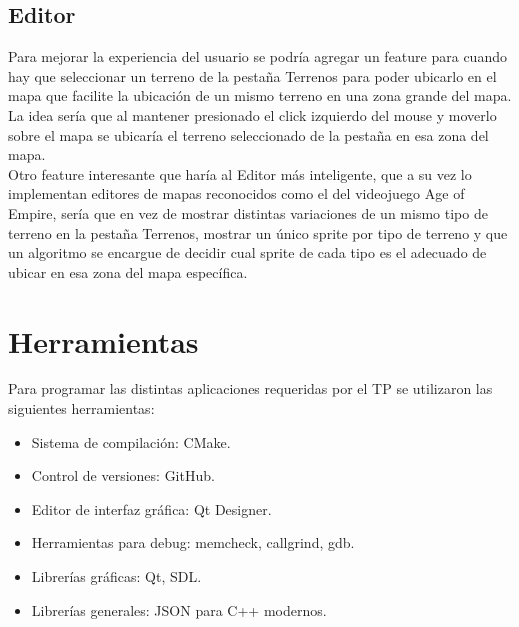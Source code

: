 \documentclass[titlepage,a4paper,12pt]{article}
\begin{document}
\subsection{Editor} 

Para mejorar la experiencia del usuario se podría agregar un feature para cuando hay que seleccionar un terreno de la pestaña Terrenos para poder ubicarlo en el mapa que facilite la ubicación de un mismo terreno en una zona grande del mapa. La idea sería que al mantener presionado el click izquierdo del mouse y moverlo sobre el mapa se ubicaría el terreno seleccionado de la pestaña en esa zona del mapa.\\

Otro feature interesante que haría al Editor más inteligente, que a su vez lo implementan editores de mapas reconocidos como el del videojuego Age of Empire, sería que en vez de mostrar distintas variaciones de un mismo tipo de terreno en la pestaña Terrenos, mostrar un único sprite por tipo de terreno y que un algoritmo se encargue de decidir cual sprite de cada tipo es el adecuado de ubicar en esa zona del mapa específica.  

\section{Herramientas}

Para programar las distintas aplicaciones requeridas por el TP se utilizaron las siguientes herramientas: 


\begin{itemize}

\item Sistema de compilación: CMake.

\item Control de versiones: GitHub.

\item Editor de interfaz gráfica: Qt Designer.

\item Herramientas para debug: memcheck, callgrind, gdb.

\item Librerías gráficas: Qt, SDL.

\item Librerías generales: JSON para C++ modernos.

\end{itemize}
\end{document}
